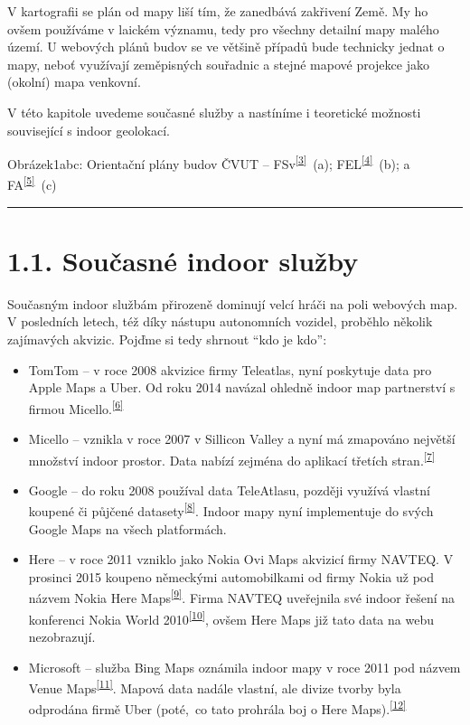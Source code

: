 V kartografii se plán od mapy liší tím, že zanedbává zakřivení Země. My ho ovšem používáme v laickém významu, tedy pro všechny detailní mapy malého území. U webových plánů budov se ve většině případů bude technicky jednat o mapy, neboť využívají zeměpisných souřadnic a stejné mapové projekce jako (okolní) mapa venkovní.

V této kapitole uvedeme současné služby a nastíníme i teoretické možnosti související s indoor geolokací.

Obrázek1abc: Orientační plány budov ČVUT -- FSv\textsuperscript{\href{}{{[}3{]}}}~(a); FEL\textsuperscript{\href{}{{[}4{]}}}~(b); a FA\textsuperscript{\href{}{{[}5{]}}}~(c)

\begin{center}\rule{0.5\linewidth}{\linethickness}\end{center}

\section{1.1. Současné indoor služby}\label{souux10dasnuxe9-indoor-sluux17eby}

Současným indoor službám přirozeně dominují velcí hráči na poli webových map. V posledních letech, též díky nástupu autonomních vozidel, proběhlo několik zajímavých akvizic. Pojďme si tedy shrnout ``kdo je kdo'':

\begin{itemize}
\tightlist
\item
  TomTom -- v roce 2008 akvizice firmy Teleatlas, nyní poskytuje data pro Apple Maps a Uber. Od roku 2014 navázal ohledně indoor map partnerství s firmou Micello.\textsuperscript{\href{}{{[}6{]}}}
\item
  Micello -- vznikla v roce 2007 v Sillicon Valley a nyní má zmapováno největší množství indoor prostor. Data nabízí zejména do aplikací třetích stran.\textsuperscript{\href{}{{[}7{]}}}
\item
  Google -- do roku 2008 používal data TeleAtlasu, později využívá vlastní koupené či půjčené datasety\textsuperscript{\href{}{{[}8{]}}}. Indoor mapy nyní implementuje do svých Google Maps na všech platformách.
\item
  Here -- v roce 2011 vzniklo jako Nokia Ovi Maps akvizicí firmy NAVTEQ. V prosinci 2015 koupeno německými automobilkami od firmy Nokia už pod názvem Nokia Here Maps\textsuperscript{\href{}{{[}9{]}}}. Firma NAVTEQ uveřejnila své indoor řešení na konferenci Nokia World 2010\textsuperscript{\href{}{{[}10{]}}}, ovšem Here Maps již tato data na webu nezobrazují.
\item
  Microsoft -- služba Bing Maps oznámila indoor mapy v roce 2011 pod názvem Venue Maps\textsuperscript{\href{}{{[}11{]}}}. Mapová data nadále vlastní, ale divize tvorby byla odprodána firmě Uber (poté,~co tato prohrála boj o Here Maps).\textsuperscript{\href{}{{[}12{]}}}
\end{itemize}

